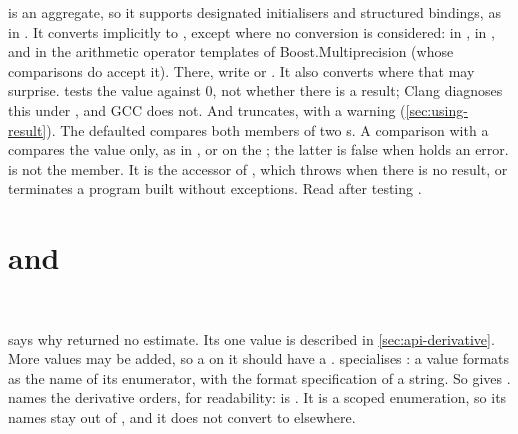  is an aggregate, so it supports designated initialisers and structured bindings, as in
. It converts implicitly to , except where no conversion is considered: in
, in , and in the arithmetic operator templates of Boost.Multiprecision (whose
comparisons do accept it). There, write  or . It also converts where that may surprise.
 tests the value against 0, not whether there is a result; Clang diagnoses this under
, and GCC does not. And  truncates, with a  warning
(\cref{sec:using-result}). The defaulted \code{==} compares both members of two s. A comparison with a
 compares the value only, as in , or  on the ; the latter
is false when  holds an error.  is not the member. It is the accessor of
, which throws  when there is no result, or terminates a program
built without exceptions. Read  after testing .

\section{\texorpdfstring{}{error} and \texorpdfstring{}{order}}\label{sec:api-error-order}

\begin{signature}
\\
\end{signature}
 says why  returned no estimate. Its one value is described in
\cref{sec:api-derivative}. More values may be added, so a  on it should have a .
 specialises : a value formats as the name of its enumerator, with the
format specification of a string. So  gives .
 names the derivative orders, for readability:  is
. It is a scoped enumeration, so its names stay out of , and it does not
convert to  elsewhere.

